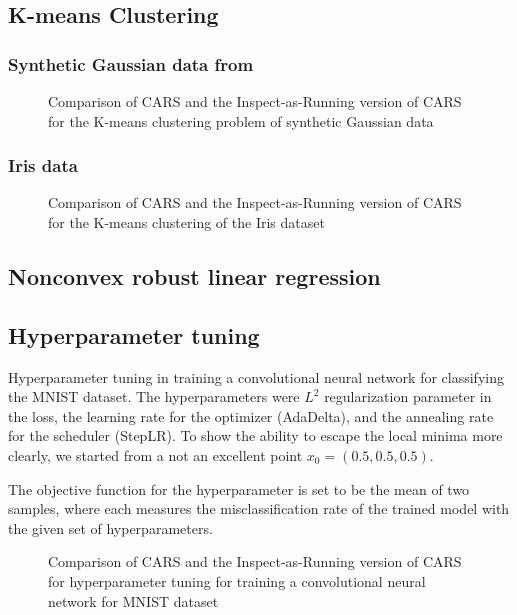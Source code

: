 \subsection{K-means Clustering}
\subsubsection{Synthetic Gaussian data from \cite{yin2018stochastic}}

\begin{figure*}
    \centering
    \caption{Comparison of CARS and the Inspect-as-Running version of CARS for the K-means clustering problem of synthetic Gaussian data}
    \label{fig: K-means synthetic}
\end{figure*}

\subsubsection{Iris data}
\begin{figure}
    \centering
    \caption{Comparison of CARS and the Inspect-as-Running version of CARS for the K-means clustering of the Iris dataset}
    \label{fig: K-means Iris}
\end{figure}
\subsection{Nonconvex robust linear regression}

\subsection{Hyperparameter tuning}
Hyperparameter tuning in training a convolutional neural network for classifying the MNIST dataset.
The hyperparameters were $L^2$ regularization parameter in the loss, the learning rate for the optimizer (AdaDelta), and the annealing rate for the scheduler (StepLR). To show the ability to escape the local minima more clearly, we started from a not an excellent point $x_0 = (0.5, 0.5, 0.5)$.

The objective function for the hyperparameter is set to be the mean of two samples, where each measures the misclassification rate of the trained model with the given set of hyperparameters.

\begin{figure}
    \centering
    \caption{Comparison of CARS and the Inspect-as-Running version of CARS for hyperparameter tuning for training a convolutional neural network for MNIST dataset}
    \label{fig: HP Tuning - MNIST}
\end{figure}
